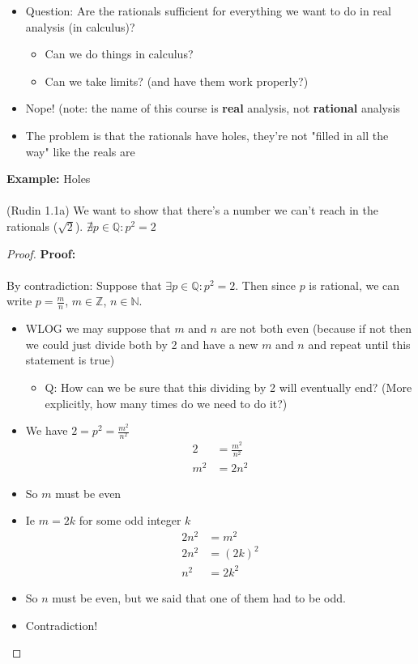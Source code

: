 \documentclass{article}
\newcommand{\Z}{\mathbb{Z}}
\newcommand{\Q}{\mathbb{Q}}
\newcommand{\N}{\mathbb{N}}
\begin{document}
\begin{itemize}
\begin{itemize}
		\item Question: Are the rationals sufficient for everything we want to do in real analysis (in calculus)?
		\begin{itemize}
			\item Can we do things in calculus? 
			\item Can we take limits? (and have them work properly?)
		\end{itemize}
		\item Nope! (note: the name of this course is \textbf{real} analysis, not \textbf{rational} analysis
		\item The problem is that the rationals have holes, they're not "filled in all the way" like the reals are
	\end{itemize}
\end{itemize}
\begin{example} 
		\textbf{Example:} Holes \\
		~\\
		(Rudin 1.1a)  We want to show that there's a number we can't reach in the rationals ($\sqrt{2}$). $\nexists p\in\Q : p^2=2$  
		\begin{proof} 
		\textbf{Proof:} \\
		~\\
		By contradiction: Suppose that $\exists p\in\Q : p^2=2$. Then since $p$ is rational, we can write $p = \frac{m}{n}$, $m\in\Z$, $n\in\N$.
		\begin{itemize}
			\item WLOG we may suppose that $m$ and $n$ are not both even (because if not then we could just divide both by 2 and have a new $m$ and $n$ and repeat until this statement is true)
			\begin{itemize}
				\item Q: How can we be sure that this dividing by 2 will eventually end? (More explicitly, how many times do we need to do it?)
			\end{itemize}
			\item We have $2 = p^2 = \frac{m^2}{n^2}$
			\begin{align}
				2 &= \frac{m^2}{n^2} \\
				m^2 &= 2n^2
			\end{align}
		\item So $m$ must be even
		\item Ie $m = 2k$ for some odd integer $k$
		\begin{align}
			2n^2 &= m^2 \\
			2n^2 &= (2k)^2 \\
			n^2 &= 2k^2 
		\end{align}
		\item So $n$ must be even, but we said that one of them had to be odd.
		\item Contradiction!
		\end{itemize}
		\end{proof}
	\end{example}
\end{document}
